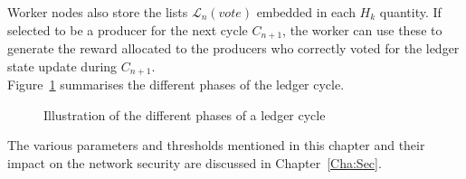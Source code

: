 Worker nodes also store the lists $\mathcal{L}_{n}(vote)$ embedded in each $H_k$ quantity. If selected to be a producer for the next cycle $C_{n+1}$, the worker can use these to generate the reward allocated to the producers who correctly voted for the ledger state update during $C_{n+1}$.\\

Figure~\ref{fig:cycle} summarises the different phases of the ledger cycle.

\begin{figure}[H]
\caption{Illustration of the different phases of a ledger cycle}
\label{fig:cycle}
\end{figure}

The various parameters and thresholds mentioned in this chapter and their impact on the network security are discussed in Chapter~\ref{Cha:Sec}.
